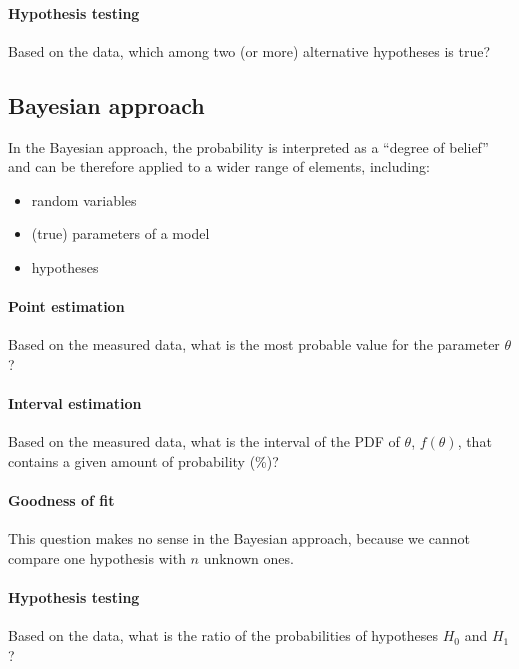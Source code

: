 \paragraph{Hypothesis testing}


Based on the data, which among two (or more) alternative hypotheses is true?

\subsection{Bayesian approach}
\label{subsec:measurement_approach_bayesian}

In the Bayesian approach, the probability is interpreted as a “degree of belief” and can be therefore applied to a wider range of elements, including:

\begin{itemize}
	\item random variables
	\item (true) parameters of a model
	\item hypotheses
\end{itemize}

\paragraph{Point estimation}

Based on the measured data, what is the most probable value for the parameter $\theta$?

\paragraph{Interval estimation}

Based on the measured data, what is the interval of the PDF of $\theta$, $f(\theta)$, that contains a given amount of probability (\%)?

\paragraph{Goodness of fit}

This question makes no sense in the Bayesian approach, because we cannot compare one hypothesis with $n$ unknown ones.

\paragraph{Hypothesis testing}


Based on the data, what is the ratio of the probabilities of hypotheses $H_{0}$ and $H_{1}$?
